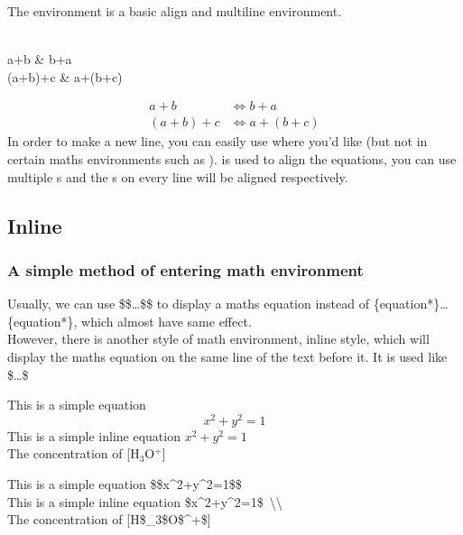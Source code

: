 \begin{frame}
	The  environment is a basic align and multiline environment.\\
	\begin{example}
		\\
		\qquad a+b \&  b+a \samplecommand{\textbackslash}\\
		\qquad (a+b)+c \&  a+(b+c) \\
	\end{example}
	\begin{align}
		a+b&\Leftrightarrow b+a\\
		(a+b)+c&\Leftrightarrow a+(b+c)
	\end{align}
	In order to make a new line, you can easily use \structure{\textbackslash\textbackslash} where you'd like (but not in certain maths environments such as ). \structure{\&} is used to align the equations, you can use multiple \structure{\&}s and the \structure{\&}s on every line will be aligned respectively.
\end{frame}

\subsection{Inline}

\begin{frame}
	\frametitle{A simple method of entering math environment}
	Usually, we can use \alert{\$\$}\dots\alert{\$\$} to display a maths equation instead of \{equation*\}\dots{}\{equation*\}, which almost have same effect.\\[0.5em]
	However, there is another style of math environment, inline style, which will display the maths equation on the same line of the text before it. It is used like \alert{\$}\dots\alert{\$}
	\begin{example}
		This is a simple equation $$x^2+y^2=1$$
		This is a simple inline equation $x^2+y^2=1$	 \\
		The concentration of [H$_3$O$^+$]
	\end{example}
	This is a simple equation \alert{\$\$}x\^{}2+y\^{}2=1\alert{\$\$}\\
	This is a simple inline equation \alert{\$}x\^{}2+y\^{}2=1\alert{\$}\ \textbackslash\textbackslash\\
	The concentration of [H\alert{\$}\_3\$O\$\^{}+\alert{\$}]
\end{frame}

